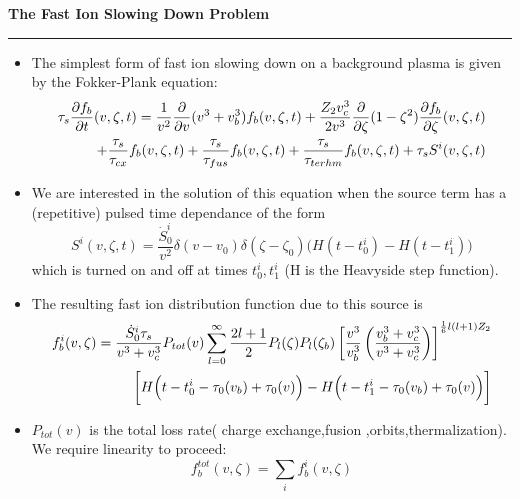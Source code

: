      \begin{slide}          \setlength{\topmargin}{-0.5in}
       \begin{center}
           \Large\bfseries The Fast Ion Slowing Down Problem 
        \end{center}
        \normalsize  

        \bigskip
        \hrule height4pt

         \begin{itemize} \bfseries \tiny
           \item
         The simplest form of fast ion slowing down on a 
         background plasma is given by the Fokker-Plank equation:
           \begin{eqnarray}
             \tau_s \frac{\partial{ f_b}}{\partial{ t}}(v,\zeta,t) = \frac{1}{v^2} 
             \frac{\partial}{\partial v}{(v^3+v_b^3)} f_b(v,\zeta,t) +\frac{Z_2v_c^3}{2 v^3}
             \frac{\partial}{\partial \zeta}{(1-\zeta^2)}  \frac{\partial{ f_b}}{\partial{ \zeta}}(v,\zeta,t)
            \nonumber \\  + \frac{\tau_s}{\tau_{cx}}f_b(v,\zeta,t) +
            \frac{\tau_s}{\tau_{fus}}f_b(v,\zeta,t) +
            \frac{\tau_s}{\tau_{terhm}}f_b(v,\zeta,t) +
            \tau_s S^i(v,\zeta,t)
            \label{eq:wav2}
           \end{eqnarray}
          \item
           We are interested in the solution of this equation when the 
           source term has a (repetitive) pulsed time
           dependance of the form
          \begin{equation} \label{eq:wav1}
          S^i(v,\zeta,t)= \frac{\dot S_0^i}{v^2}\delta(v-v_0) \delta(\zeta
          -\zeta_0) \biggl( H(t-t_0^i) - H(t-t_1^i) \biggr)
                    \end{equation}
           which is turned on and off at times  $t_0^i ,t_1^i $ (H is
           the Heavyside step function).
           \item 
           The resulting fast ion distribution function due to this
           source is
          \begin{eqnarray}  %
           f_b^i(v,\zeta)= \frac{\dot S_0^i \tau_s}{v^3+v_c^3} P_{tot}(v)
               \sum_{l=0}^{\infty}\frac{2l+1}{2}P_l(\zeta)P_l(\zeta_b)
               \left[\frac{v^3}{v_b^3} \left(\frac{v_b^3+v_c^3}{v^3+v_c^3}
                \right)\right]^{\frac{1}{6}l(l+1)Z_2} \nonumber \\  
            \bigg[
                   H\Bigl(t-t_0^i - \tau_0(v_b)+\tau_0(v) \Bigr)
                   -H\Bigl(t-t_1^i - \tau_0(v_b)+\tau_0(v) \Bigr)
            \bigg]
              \label{eq:wav3a}
          \end{eqnarray}
            \item  $P_{tot}(v) $ is the total loss rate( charge
            exchange,fusion ,orbits,thermalization). We require
            linearity to proceed:
            \begin{equation}
               f_b^{tot}(v,\zeta) = \sum_{i}f_b^i(v,\zeta)
              \label{eq:wav4a}
            \end{equation} 
    \end{itemize}
    \end{slide}
